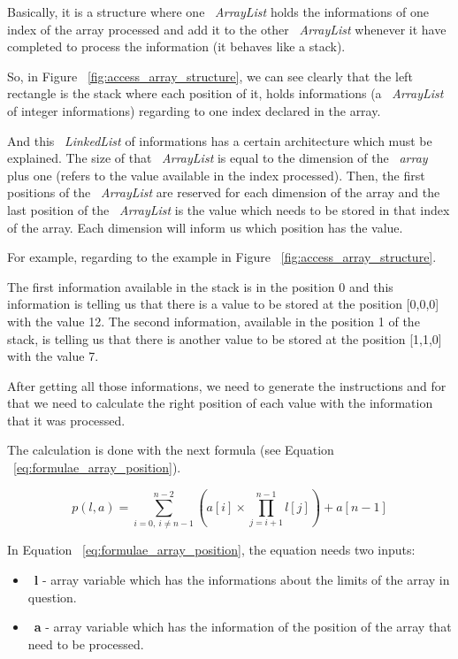 \documentclass[
  oneside,
  11pt, a4paper,
  footinclude=true,
  headinclude=true,
  cleardoublepage=empty
]{scrbook}
\begin{document}
Basically, it is a structure where one ~\textit{ArrayList} holds the informations of one index of the array processed and add it to the other ~\textit{ArrayList} whenever it have completed to process the information (it behaves like a stack).

So, in Figure ~\ref{fig:access_array_structure}, we can see clearly that the left rectangle is the stack where each position of it, holds informations (a ~\textit{ArrayList} of integer informations) regarding to one index declared in the array.

And this ~\textit{LinkedList} of informations has a certain architecture which must be explained.
The size of that ~\textit{ArrayList} is equal to the dimension of the ~\textit{array} plus one (refers to the value available in the index processed). Then, the first positions of the ~\textit{ArrayList} are reserved for each dimension of the array and the last position of the ~\textit{ArrayList} is the value which needs to be stored in that index of the array.
Each dimension will inform us which position has the value.

For example, regarding to the example in Figure ~\ref{fig:access_array_structure}.

The first information available in the stack is in the position 0 and this information is telling us that there is a value to be stored at the position [0,0,0] with the value 12. The second information, available in the position 1 of the stack, is telling us that there is another value to be stored at the position [1,1,0] with the value 7.

After getting all those informations, we need to generate the instructions and for that we need to calculate the right position of each value with the information that it was processed.

The calculation is done with the next formula (see Equation ~\ref{eq:formulae_array_position}).

\begin{equation} \label{eq:formulae_array_position}
  p(l,a) = \sum_{i=0,\ i\neq n-1}^{n-2} (a[i]\times\prod_{j=i+1}^{n-1} l[j])+a[n-1]
\end{equation}

In Equation ~\ref{eq:formulae_array_position}, the equation needs two inputs:

\begin{itemize}
\item ~\textbf{l} - array variable which has the informations about the limits of the array in question.
\item ~\textbf{a} - array variable which has the information of the position of the array that need to be processed.
\end{itemize}
\end{document}
